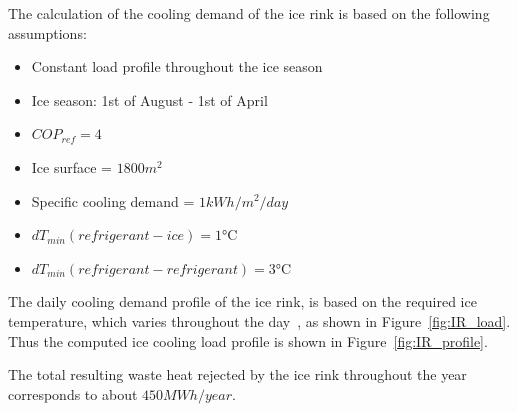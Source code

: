 \documentclass{article}
\begin{document}
The calculation of the cooling demand of the ice rink is based on the following assumptions:
\begin{itemize}
	\item Constant load profile throughout the ice season
	\item Ice season: 1st of August - 1st of April
	\item $COP_{ref} = 4$~\cite{kolasniewskiEvaluationModellingIce2017}
	\item Ice surface = $1800m^2 $~\cite{kolasniewskiEvaluationModellingIce2017}
	\item Specific cooling demand = $1kWh/m^2/day$~\cite{kolasniewskiEvaluationModellingIce2017}
	\item $dT_{min}(refrigerant-ice) = 1 \si{\celsius}$
	\item $dT_{min}(refrigerant-refrigerant) = 3 \si{\celsius}$
\end{itemize}

The daily cooling demand profile of the ice rink, is based on the required ice temperature, which varies throughout the day~\cite{kolasniewskiEvaluationModellingIce2017}, as shown in Figure~\ref{fig:IR_load}. Thus the computed ice cooling load profile is shown in Figure~\ref{fig:IR_profile}.

The total resulting waste heat rejected by the ice rink throughout the year corresponds to about $ 450 MWh/year$.
\end{document}
